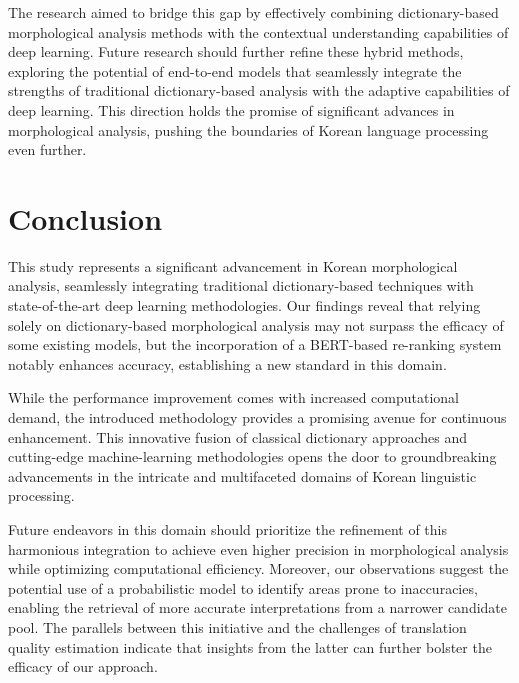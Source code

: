 \documentclass[AMS,STIX2COL]{WileyNJD-v2}
\begin{document}
    The research aimed to bridge this gap by effectively combining dictionary-based morphological analysis methods with the contextual understanding capabilities of deep learning.
    Future research should further refine these hybrid methods, exploring the potential of end-to-end models that seamlessly integrate the strengths of traditional dictionary-based analysis with the adaptive capabilities of deep learning.
    This direction holds the promise of significant advances in morphological analysis, pushing the boundaries of Korean language processing even further.


    \section{Conclusion}\label{sec:conclusion}

    This study represents a significant advancement in Korean morphological analysis, seamlessly integrating traditional dictionary-based techniques with state-of-the-art deep learning methodologies.
    Our findings reveal that relying solely on dictionary-based morphological analysis may not surpass the efficacy of some existing models, but the incorporation of a BERT-based re-ranking system notably enhances accuracy, establishing a new standard in this domain.

    While the performance improvement comes with increased computational demand, the introduced methodology provides a promising avenue for continuous enhancement.
    This innovative fusion of classical dictionary approaches and cutting-edge machine-learning methodologies opens the door to groundbreaking advancements in the intricate and multifaceted domains of Korean linguistic processing.

    Future endeavors in this domain should prioritize the refinement of this harmonious integration to achieve even higher precision in morphological analysis while optimizing computational efficiency.
    Moreover, our observations suggest the potential use of a probabilistic model to identify areas prone to inaccuracies, enabling the retrieval of more accurate interpretations from a narrower candidate pool.
    The parallels between this initiative and the challenges of translation quality estimation indicate that insights from the latter can further bolster the efficacy of our approach.


    
\end{document}
